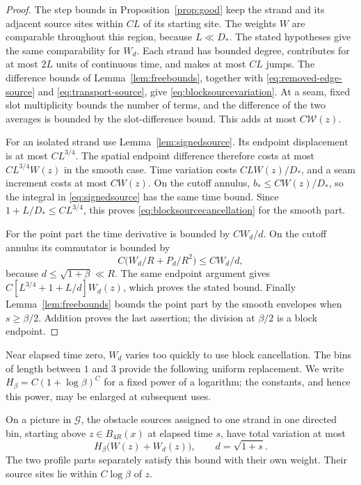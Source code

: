 \begin{proof}
The step bounds in Proposition~\ref{prop:good} keep the strand and
its adjacent source sites within $CL$ of its starting site.  The
weights $W$ are comparable throughout this region, because $L\ll D_*$.
The stated hypotheses give the same comparability for $W_d$.
Each strand has bounded degree, contributes for at most $2L$ units
of continuous time, and makes at most $CL$ jumps.  The difference
bounds of Lemma~\ref{lem:freebounds}, together with
\eqref{eq:removed-edge-source} and \eqref{eq:transport-source},
give \eqref{eq:blocksourcevariation}.  At a seam, fixed slot
multiplicity bounds the number of terms, and the difference of the
two averages is bounded by the slot-difference bound.  This adds at
most $C\mathcal W(z)$.

For an isolated strand use Lemma~\ref{lem:signedsource}.  Its endpoint
displacement is at most $CL^{3/4}$.  The spatial endpoint difference
therefore costs at most $CL^{3/4}W(z)$ in the smooth case.  Time
variation costs $CLW(z)/D_*$, and a seam increment costs at most
$CW(z)$.  On the cutoff annulus,
$b_*\le CW(z)/D_*$, so the integral in
\eqref{eq:signedsource} has the same time bound.  Since
$1+L/D_*\le CL^{3/4}$, this proves
\eqref{eq:blocksourcecancellation} for the smooth part.

For the point part the time derivative is bounded by $CW_d/d$.
On the cutoff annulus its commutator is bounded by
\[
 C\bigl(W_d/R+P_d/R^2\bigr)\le CW_d/d,
\]
because $d\le\sqrt{1+\beta}\ll R$.  The same endpoint argument
gives $C[L^{3/4}+1+L/d]W_d(z)$, which proves the stated bound.
Finally Lemma~\ref{lem:freebounds} bounds the point part by the
smooth envelopes when $s\ge\beta/2$.  Addition proves the last
assertion; the division at $\beta/2$ is a block endpoint.
\end{proof}

Near elapsed time zero, $W_d$ varies too quickly to use block
cancellation.  The bins of length between $1$ and $3$ provide the
following uniform replacement.  We write
$H_\beta=C(1+\log\beta)^C$ for a fixed power of a logarithm;
the constants, and hence this power, may be enlarged at subsequent
uses.

\begin{lemma}\label{lem:sourcebins}
On a picture in $\mathcal G$, the obstacle sources assigned to one
strand in one directed bin, starting above $z\in B_{4R}(x)$ at elapsed time $s$,
have total variation at most
\begin{equation}\label{eq:binsourcevariation}
 H_\beta\bigl(W(z)+W_d(z)\bigr),\qquad d=\sqrt{1+s}.
\end{equation}
The two profile parts separately satisfy this bound with their own
weight.  Their source sites lie within $C\log\beta$ of $z$.
\end{lemma}

